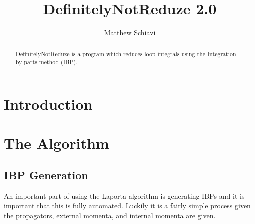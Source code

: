 \documentclass[preprintnumbers,superscriptaddress,nofootinbib,aps,prd,floatfix]{revtex4}
\newcommand{\dnr}{DefinitelyNotReduze }
\begin{document}
 

\title{\dnr 2.0}

\begin{abstract}
\noindent 
\dnr is a program which reduces loop integrals using the Integration by parts method (IBP). 

\end{abstract}

\author{Matthew Schiavi }

\smallskip


\pacs{}


\maketitle

\tableofcontents
\newpage

\section{Introduction}
\label{sec:intro}


\section{The Algorithm}
\subsection{IBP Generation}
An important part of using the Laporta algorithm is generating IBPs and it is important that this is fully automated. Luckily it is a fairly simple process given the propagators, external momenta, and internal momenta are given. 
\end{document}
